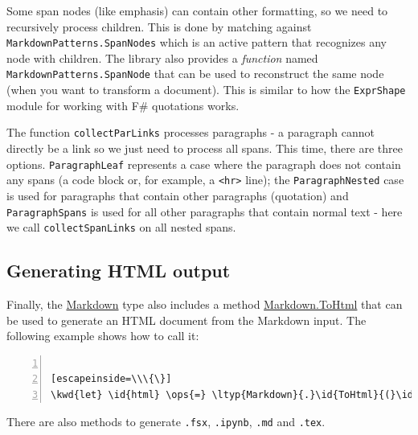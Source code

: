 \documentclass{article}
\newcommand{\id}[1]{\textcolor{black}{#1}}
\newcommand{\kwd}[1]{\textcolor{navy}{#1}}
\newcommand{\ops}[1]{\textcolor{purple}{#1}}
\begin{document}
Some span nodes (like emphasis) can contain other formatting, so we need to recursively
process children. This is done by matching against \texttt{MarkdownPatterns.SpanNodes} which is an active
pattern that recognizes any node with children. The library also provides a \emph{function}
named \texttt{MarkdownPatterns.SpanNode} that can be used to reconstruct the same node (when you want
to transform a document). This is similar to how the \texttt{ExprShape} module for working with
F\# quotations works.


The function \texttt{collectParLinks} processes paragraphs - a paragraph cannot directly be a
link so we just need to process all spans. This time, there are three options.
\texttt{ParagraphLeaf} represents a case where the paragraph does not contain any spans
(a code block or, for example, a \texttt{<hr>} line); the \texttt{ParagraphNested} case is used for paragraphs
that contain other paragraphs (quotation) and \texttt{ParagraphSpans} is used for all other
paragraphs that contain normal text - here we call \texttt{collectSpanLinks} on all nested spans.
\subsection*{Generating HTML output}



Finally, the \href{https://fsprojects.github.io/FSharp.Formatting/reference/fsharp-formatting-markdown-markdown.html}{Markdown} type also includes a method \href{https://fsprojects.github.io/FSharp.Formatting/reference/fsharp-formatting-markdown-markdown.html\#ToHtml}{Markdown.ToHtml} that can be used
to generate an HTML document from the Markdown input. The following example shows how to call it:
\begin{lstlisting}[numbers=left]

[escapeinside=\\\{\}]
\kwd{let} \id{html} \ops{=} \ltyp{Markdown}{.}\id{ToHtml}{(}\id{parsed}{)}

\end{lstlisting}



There are also methods to generate \texttt{.fsx}, \texttt{.ipynb}, \texttt{.md} and \texttt{.tex}.
\end{document}
